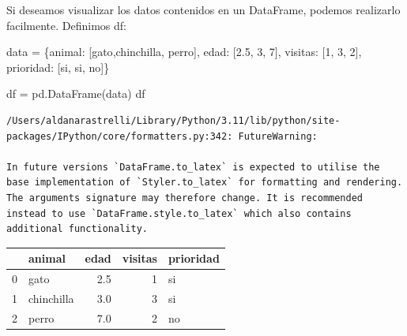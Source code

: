 \documentclass[
  letterpaper,
  DIV=11,
  numbers=noendperiod]{scrreprt}
\newenvironment{Shaded}{\begin{snugshade}}{\end{snugshade}}
\newcommand{\DecValTok}[1]{\textcolor[rgb]{0.68,0.00,0.00}{#1}}
\newcommand{\FloatTok}[1]{\textcolor[rgb]{0.68,0.00,0.00}{#1}}
\newcommand{\NormalTok}[1]{\textcolor[rgb]{0.00,0.23,0.31}{#1}}
\newcommand{\OperatorTok}[1]{\textcolor[rgb]{0.37,0.37,0.37}{#1}}
\newcommand{\StringTok}[1]{\textcolor[rgb]{0.13,0.47,0.30}{#1}}
\begin{document}
Si deseamos visualizar los datos contenidos en un DataFrame, podemos
realizarlo facilmente. Definimos df:

\begin{Shaded}
\begin{Highlighting}[]
\NormalTok{data }\OperatorTok{=}\NormalTok{ \{}\StringTok{\textquotesingle{}animal\textquotesingle{}}\NormalTok{: [}\StringTok{\textquotesingle{}gato\textquotesingle{}}\NormalTok{,}\StringTok{\textquotesingle{}chinchilla\textquotesingle{}}\NormalTok{, }\StringTok{\textquotesingle{}perro\textquotesingle{}}\NormalTok{],}
        \StringTok{\textquotesingle{}edad\textquotesingle{}}\NormalTok{: [}\FloatTok{2.5}\NormalTok{, }\DecValTok{3}\NormalTok{, }\DecValTok{7}\NormalTok{],}
        \StringTok{\textquotesingle{}visitas\textquotesingle{}}\NormalTok{: [}\DecValTok{1}\NormalTok{, }\DecValTok{3}\NormalTok{, }\DecValTok{2}\NormalTok{],}
        \StringTok{\textquotesingle{}prioridad\textquotesingle{}}\NormalTok{: [}\StringTok{\textquotesingle{}si\textquotesingle{}}\NormalTok{, }\StringTok{\textquotesingle{}si\textquotesingle{}}\NormalTok{, }\StringTok{\textquotesingle{}no\textquotesingle{}}\NormalTok{]\}}

\NormalTok{df }\OperatorTok{=}\NormalTok{ pd.DataFrame(data)}
\NormalTok{df}
\end{Highlighting}
\end{Shaded}

\begin{verbatim}
/Users/aldanarastrelli/Library/Python/3.11/lib/python/site-packages/IPython/core/formatters.py:342: FutureWarning:

In future versions `DataFrame.to_latex` is expected to utilise the base implementation of `Styler.to_latex` for formatting and rendering. The arguments signature may therefore change. It is recommended instead to use `DataFrame.style.to_latex` which also contains additional functionality.
\end{verbatim}

\begin{tabular}{llrrl}
\toprule
{} &      animal &  edad &  visitas & prioridad \\
\midrule
0 &        gato &   2.5 &        1 &        si \\
1 &  chinchilla &   3.0 &        3 &        si \\
2 &       perro &   7.0 &        2 &        no \\
\bottomrule
\end{tabular}
\end{document}
